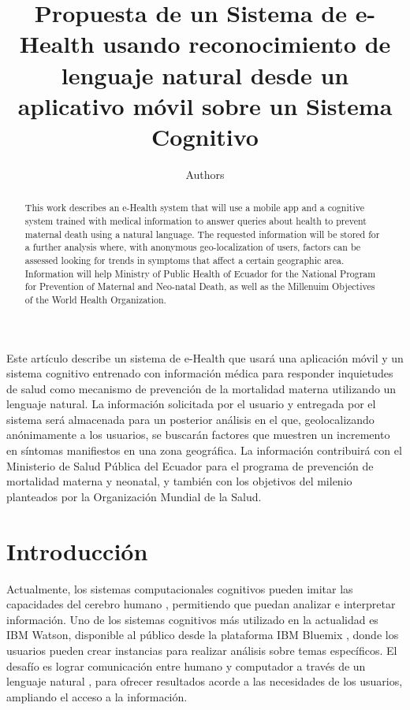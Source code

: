 \documentclass[12pt]{article}
\title{Propuesta de un Sistema de e-Health usando reconocimiento de lenguaje natural desde un aplicativo móvil sobre un Sistema Cognitivo}
\author{Authors}
\begin{document}
 

\maketitle

\begin{abstract}
This work describes an e-Health system that will use a mobile app and a cognitive system trained with medical information to answer queries about health to prevent maternal death using a natural language. The requested information will be stored for a further analysis where, with anonymous geo-localization of users, factors can be assessed looking for trends in symptoms that affect a certain geographic area. Information will help Ministry of Public Health of Ecuador for the National Program for Prevention of Maternal and Neo-natal Death, as well as the Millenuim Objectives of the World Health Organization.
\end{abstract}
     
\begin{resumen} 
Este artículo describe un sistema de e-Health que usará una aplicación móvil y un sistema cognitivo entrenado con información médica para responder inquietudes de salud como mecanismo de prevención de la mortalidad materna utilizando un lenguaje natural. La información solicitada por el usuario y entregada por el sistema será almacenada para un posterior análisis en el que, geolocalizando anónimamente a los usuarios, se buscarán factores que muestren un incremento en síntomas manifiestos en una zona geográfica. La información contribuirá con el Ministerio de Salud Pública del Ecuador para el programa de prevención de mortalidad materna y neonatal, y también con los objetivos del milenio planteados por la Organización Mundial de la Salud.
\end{resumen}


\section{Introducción}
Actualmente, los sistemas computacionales cognitivos pueden imitar las capacidades del cerebro humano \cite{banavar2015watson}, permitiendo que puedan analizar e interpretar información. Uno de los sistemas cognitivos más utilizado en la actualidad es IBM Watson, disponible al público desde la plataforma IBM Bluemix \cite{watson2016}, donde los usuarios pueden crear instancias para realizar análisis sobre temas específicos. El desafío es lograr comunicación entre humano y computador a través de un lenguaje natural \cite{ibm2015}, para ofrecer resultados acorde a las necesidades de los usuarios, ampliando el acceso a la información.
\end{document}
